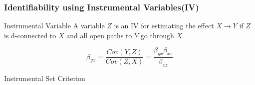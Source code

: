 \documentclass{beamer}
\begin{document}

\begin{frame}
	\frametitle{Identifiability using Instrumental Variables(IV)}
	\begin{block}{Instrumental Variable}
		A variable $ Z $ is an IV for estimating the effect $ X \rightarrow Y $
		if $ Z $ is d-connected to $ X $ and all open paths to $ Y $ go through
		$ X $.
	\end{block}
	\begin{figure}
		\centering
		\begin{subfigure}{0.5\linewidth}
		\end{subfigure}%
		\begin{subfigure}{0.5\linewidth}
			$$ \beta_{yx} = \frac{Cov(Y, Z)}{Cov(Z, X)} = \frac{\beta_{yx} \beta_{xz}}{\beta_{xz}}$$
		\end{subfigure}
	\end{figure}
	\begin{block}{Instrumental Set Criterion}
	\end{block}
\end{frame}
\end{document}
